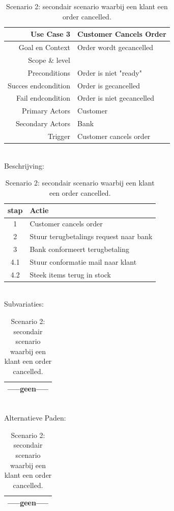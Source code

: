 \documentclass[•]{article}
\begin{document}
\begin{table}
\centering
\begin{tabular}{|rl|}
\hline
Use Case 3 & Customer Cancels Order \\
\hline
Goal en Context 		& Order wordt gecancelled\\
Scope \& level 			& \\
Preconditions			& Order is niet "ready"\\
Succes endcondition 	& Order is gecancelled\\
Fail endcondition		& Order is niet gecancelled\\
Primary Actors			& Customer\\
Secondary Actors		& Bank\\
Trigger					& Customer cancels order\\
\hline
\end{tabular}
\\
Beschrijving:
\\
\begin{tabular}{|cl|}
\hline
stap	& Actie\\
\hline
1	& Customer cancels order\\
2	& Stuur terugbetalings request naar bank\\
3	& Bank conformeert terugbetaling\\
4.1	& Stuur conformatie mail naar klant\\
4.2	& Steek items terug in stock\\ 
\hline
\end{tabular}
\\
Subvariaties:
\\
\begin{tabular}{|c|}
\hline
-----geen-----\\
\hline
\end{tabular}
\\
Alternatieve Paden:
\\
\begin{tabular}{|c|}
\hline
-----geen-----\\
\hline
\end{tabular}
\caption{Scenario 2: secondair scenario waarbij een klant een order cancelled.}
\label{Sec_scenario_2}
\end{table}
\end{document}
